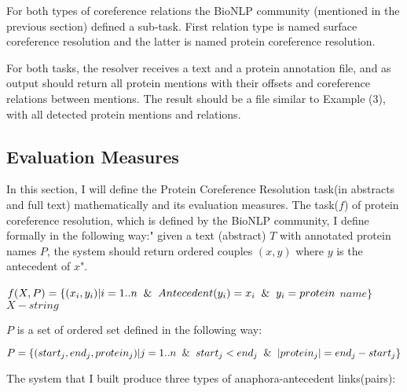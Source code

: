 For both types of coreference relations the BioNLP community (mentioned in the previous section) defined a sub-task. First relation type is named surface coreference resolution and the latter is named protein coreference resolution.

For both tasks, the resolver receives a text and a protein annotation file, and as output should return all protein mentions with their offsets and coreference relations between mentions. The result should be a file similar to Example (3), with all detected protein mentions and relations. 

\subsection{Evaluation Measures}

In this section, I will define the Protein Coreference Resolution task(in abstracts and full text) mathematically and its evaluation measures. The task($f$) of protein coreference resolution, which is defined by the BioNLP community, I define formally in the following way:" given a text (abstract) $T$ with annotated protein names $P$, the system should return ordered couples $(x, y)$ where $y$  is the antecedent of $x$".\\
\begin{center}
  $f(X,P)=\{(x_i,y_i) |i=1..n \And Antecedent(y_i)=x_i \And y_i= protein$  $name\}$ \\
  $X-string$ \\
\end{center}

$P$ is a set of ordered set defined in the following way:\\
\begin{center}
    $P= \{(start_j, end_j, protein_j)| j=1..n \And start_j< end_j \And |protein_j|= end_j-start_j\}$\\
\end{center}
 
The system that I built produce three types of anaphora-antecedent links(pairs):

